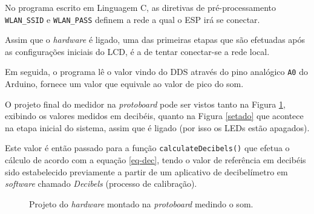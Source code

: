 \documentclass[
    12pt,               %
    openright,          %
    oneside,
    a4paper,            
    english,            %
    brazil              %
    ]{abntex2}
\begin{document}
No programa escrito em Linguagem C, as diretivas de pré-processamento \texttt{WLAN\_SSID} e \texttt{WLAN\_PASS} definem a rede a qual o ESP irá se conectar.

Assim que o \textit{hardware} é ligado, uma das primeiras etapas que são efetuadas após as configurações iniciais do LCD, é a de tentar conectar-se a rede local.

Em seguida, o programa lê o valor vindo do DDS através do pino analógico \texttt{A0} do Arduino, fornece um valor que equivale ao valor de pico do som. 

O projeto final do medidor na \textit{protoboard} pode ser vistos tanto na Figura \ref{medindo}, exibindo os valores medidos em decibéis, quanto na Figura \ref{setado} que acontece na etapa inicial do sistema, assim que é ligado (por isso os LEDs estão apagados).

Este valor é então passado para a função \texttt{calculateDecibels()} que efetua o cálculo de acordo com a equação \ref{eq-dec}, tendo o valor de referência em decibéis sido estabelecido previamente a partir de um aplicativo de decibelímetro em \textit{software} chamado \textit{Decibels} (processo de calibração). 

\begin{figure}[!htb]
    \centering
    \qquad
    \caption{Projeto do \textit{hardware} montado na \textit{protoboard} medindo o som.}%
    \label{medindo}
\end{figure}
\end{document}
